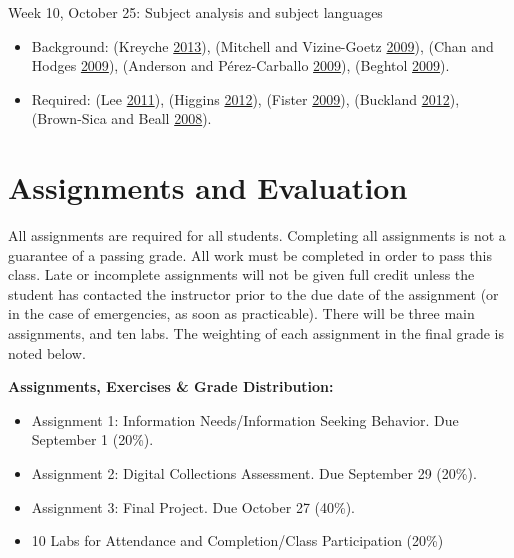 \documentclass[]{article}
\providecommand{\tightlist}{%
  \setlength{\itemsep}{0pt}\setlength{\parskip}{0pt}}
\begin{document}
Week 10, October 25: Subject analysis and subject languages

\begin{itemize}
\tightlist
\item
  Background: (Kreyche
  \protect\hyperlink{ref-kreycheux5fsubjectux5f2013}{2013}), (Mitchell
  and Vizine-Goetz
  \protect\hyperlink{ref-mitchellux5fdeweyux5f2009}{2009}), (Chan and
  Hodges \protect\hyperlink{ref-chanux5flibraryux5f2009}{2009}),
  (Anderson and Pérez-Carballo
  \protect\hyperlink{ref-andersonux5flibraryux5f2009}{2009}), (Beghtol
  \protect\hyperlink{ref-beghtolux5fclassificationux5f2009}{2009}).
\item
  Required: (Lee
  \protect\hyperlink{ref-leeux5findigenousux5f2011}{2011}), (Higgins
  \protect\hyperlink{ref-higginsux5flibraryux5f2012}{2012}), (Fister
  \protect\hyperlink{ref-fisterux5fdeweyux5f2009}{2009}), (Buckland
  \protect\hyperlink{ref-bucklandux5fobsolescenceux5f2012}{2012}),
  (Brown-Sica and Beall
  \protect\hyperlink{ref-brown-sicaux5flibraryux5f2008}{2008}).
\end{itemize}

\section{Assignments and Evaluation}\label{assignments-and-evaluation}

All assignments are required for all students. Completing all
assignments is not a guarantee of a passing grade. All work must be
completed in order to pass this class. Late or incomplete assignments
will not be given full credit unless the student has contacted the
instructor prior to the due date of the assignment (or in the case of
emergencies, as soon as practicable). There will be three main
assignments, and ten labs. The weighting of each assignment in the final
grade is noted below.

\textbf{Assignments, Exercises \& Grade Distribution:}

\begin{itemize}
\tightlist
\item
  Assignment 1: Information Needs/Information Seeking Behavior. Due
  September 1 (20\%).
\item
  Assignment 2: Digital Collections Assessment. Due September 29 (20\%).
\item
  Assignment 3: Final Project. Due October 27 (40\%).
\item
  10 Labs for Attendance and Completion/Class Participation (20\%)
\end{itemize}
\end{document}
